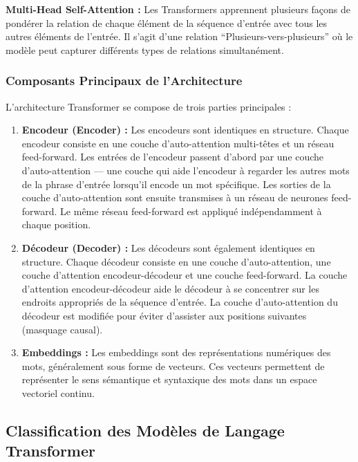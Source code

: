 \textbf{Multi-Head Self-Attention :}
Les Transformers apprennent plusieurs façons de pondérer la relation de chaque élément de la séquence d'entrée avec tous les autres éléments de l'entrée. Il s'agit d'une relation \enquote{Plusieurs-vers-plusieurs} où le modèle peut capturer différents types de relations simultanément.

\subsubsection{Composants Principaux de l'Architecture}

L'architecture Transformer se compose de trois parties principales :

\begin{enumerate}
    \item \textbf{Encodeur (Encoder) :}
    Les encodeurs sont identiques en structure. Chaque encodeur consiste en une couche d'auto-attention multi-têtes et un réseau feed-forward. Les entrées de l'encodeur passent d'abord par une couche d'auto-attention — une couche qui aide l'encodeur à regarder les autres mots de la phrase d'entrée lorsqu'il encode un mot spécifique. Les sorties de la couche d'auto-attention sont ensuite transmises à un réseau de neurones feed-forward. Le même réseau feed-forward est appliqué indépendamment à chaque position.
    
    \item \textbf{Décodeur (Decoder) :}
    Les décodeurs sont également identiques en structure. Chaque décodeur consiste en une couche d'auto-attention, une couche d'attention encodeur-décodeur et une couche feed-forward. La couche d'attention encodeur-décodeur aide le décodeur à se concentrer sur les endroits appropriés de la séquence d'entrée. La couche d'auto-attention du décodeur est modifiée pour éviter d'assister aux positions suivantes (masquage causal).
    
    \item \textbf{Embeddings :}
    Les embeddings sont des représentations numériques des mots, généralement sous forme de vecteurs. Ces vecteurs permettent de représenter le sens sémantique et syntaxique des mots dans un espace vectoriel continu.
\end{enumerate}

\subsection{Classification des Modèles de Langage Transformer}

